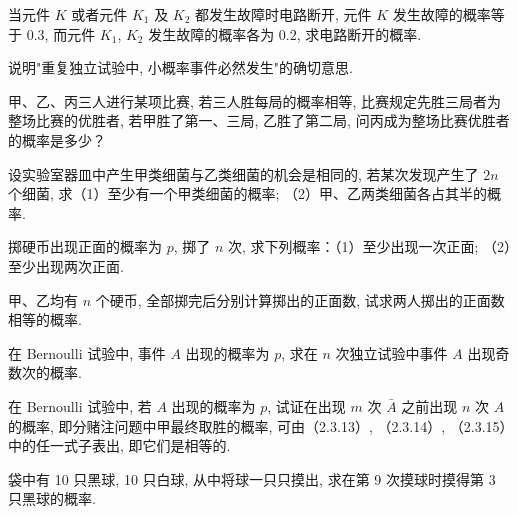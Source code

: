 \documentclass[../../main.tex]{subfiles}
\begin{document}
\begin{exercise}\label{exercise:ch02-22}
当元件 $K$ 或者元件 $K_1$ 及 $K_2$ 都发生故障时电路断开, 元件 $K$ 发生故障的概率等于 $0.3$, 而元件 $K_1$, $K_2$ 发生故障的概率各为 $0.2$, 求电路断开的概率.
\end{exercise}

\begin{exercise}\label{exercise:ch02-23}
说明"重复独立试验中, 小概率事件必然发生"的确切意思.
\end{exercise}

\begin{exercise}\label{exercise:ch02-24}
甲、乙、丙三人进行某项比赛, 若三人胜每局的概率相等, 比赛规定先胜三局者为整场比赛的优胜者, 若甲胜了第一、三局, 乙胜了第二局, 问丙成为整场比赛优胜者的概率是多少？
\end{exercise}

\begin{exercise}\label{exercise:ch02-25}
设实验室器皿中产生甲类细菌与乙类细菌的机会是相同的, 若某次发现产生了 $2n$ 个细菌, 求（1）至少有一个甲类细菌的概率; （2）甲、乙两类细菌各占其半的概率.
\end{exercise}

\begin{exercise}\label{exercise:ch02-26}
掷硬币出现正面的概率为 $p$, 掷了 $n$ 次, 求下列概率：（1）至少出现一次正面; （2）至少出现两次正面.
\end{exercise}

\begin{exercise}\label{exercise:ch02-27}
甲、乙均有 $n$ 个硬币, 全部掷完后分别计算掷出的正面数, 试求两人掷出的正面数相等的概率.
\end{exercise}

\begin{exercise}\label{exercise:ch02-28}
在 Bernoulli 试验中, 事件 $A$ 出现的概率为 $p$, 求在 $n$ 次独立试验中事件 $A$ 出现奇数次的概率.
\end{exercise}

\begin{exercise}\label{exercise:ch02-29}
在 Bernoulli 试验中, 若 $A$ 出现的概率为 $p$, 试证在出现 $m$ 次 $\bar{A}$ 之前出现 $n$ 次 $A$ 的概率, 即分赌注问题中甲最终取胜的概率, 可由（2.3.13）, （2.3.14）, （2.3.15）中的任一式子表出, 即它们是相等的.
\end{exercise}

\begin{exercise}\label{exercise:ch02-30}
袋中有 10 只黑球, 10 只白球, 从中将球一只只摸出, 求在第 9 次摸球时摸得第 3 只黑球的概率.
\end{exercise}
\end{document}
